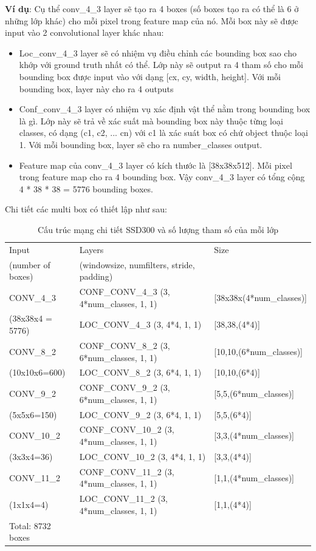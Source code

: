 \documentclass[a4paper]{report}
\begin{document}
\textbf{Ví dụ}: Cụ thể conv\_4\_3 layer sẽ tạo ra 4 boxes (số boxes tạo ra có thể là 6 ở những lớp khác) cho mỗi pixel trong feature map của nó. Mỗi box này sẽ được input vào 2 convolutional layer khác nhau:
\begin{itemize}
\item Loc\_conv\_4\_3 layer sẽ có nhiệm vụ điều chỉnh các bounding box sao cho khớp với ground truth nhất có thể. Lớp này sẽ output ra 4 tham số cho mỗi bounding box được input vào với dạng [cx, cy, width, height]. Với mỗi bounding box, layer này cho ra 4 outputs
\item Conf\_conv\_4\_3 layer có nhiệm vụ xác định vật thể nằm trong bounding box là gì.
Lớp này sẽ trả về xác suất mà bounding box này thuộc từng loại classes, có dạng (c1, c2, ... cn) với c1 là xác suát box có chứ object thuộc loại 1. Với mỗi bounding box, layer sẽ cho ra number\_classes output.
\item Feature map của conv\_4\_3 layer có kích thước là [38x38x512]. Mỗi pixel trong feature map cho ra 4 bounding box. Vậy conv\_4\_3 layer có tổng cộng 4 * 38 * 38 = 5776 bounding boxes.
\end{itemize}

Chi tiết các multi box có thiết lập như sau:

\begin{table}[h]
	\centering
	\caption{Cấu trúc mạng chi tiết SSD300 và số lượng tham số của mỗi lớp}
	\begin{tabular}{|l|l|l|}
		\hline
		Input & Layers & Size \\
		(number of boxes) & (windowsize, numfilters, stride, padding) & \\ \hline
		CONV\_4\_3 & CONF\_CONV\_4\_3 (3, 4*num\_classes, 1, 1)  & [38x38x(4*num\_classes)] \\
		(38x38x4 = 5776) & LOC\_CONV\_4\_3 (3, 4*4, 1, 1) & [38,38,(4*4)] \\ \hline
		CONV\_8\_2 & CONF\_CONV\_8\_2 (3, 6*num\_classes, 1, 1)  & [10,10,(6*num\_classes)] \\
		(10x10x6=600) & LOC\_CONV\_8\_2 (3, 6*4, 1, 1) & [10,10,(6*4)] \\ \hline
		CONV\_9\_2 & CONF\_CONV\_9\_2 (3, 6*num\_classes, 1, 1)  & [5,5,(6*num\_classes)] \\
		(5x5x6=150) & LOC\_CONV\_9\_2 (3, 6*4, 1, 1) & [5,5,(6*4)] \\ \hline
		CONV\_10\_2 & CONF\_CONV\_10\_2 (3, 4*num\_classes, 1, 1) & [3,3,(4*num\_classes)] \\ 
		(3x3x4=36) & LOC\_CONV\_10\_2 (3, 4*4, 1, 1) & [3,3,(4*4)] \\ \hline
		CONV\_11\_2 & CONF\_CONV\_11\_2 (3, 4*num\_classes, 1, 1) & [1,1,(4*num\_classes)] \\
		(1x1x4=4) & LOC\_CONV\_11\_2 (3, 4*num\_classes, 1, 1)  & [1,1,(4*4)] \\ \hline
		Total: 8732 boxes	& & \\ \hline
\end{tabular}
\end{table}
\end{document}
